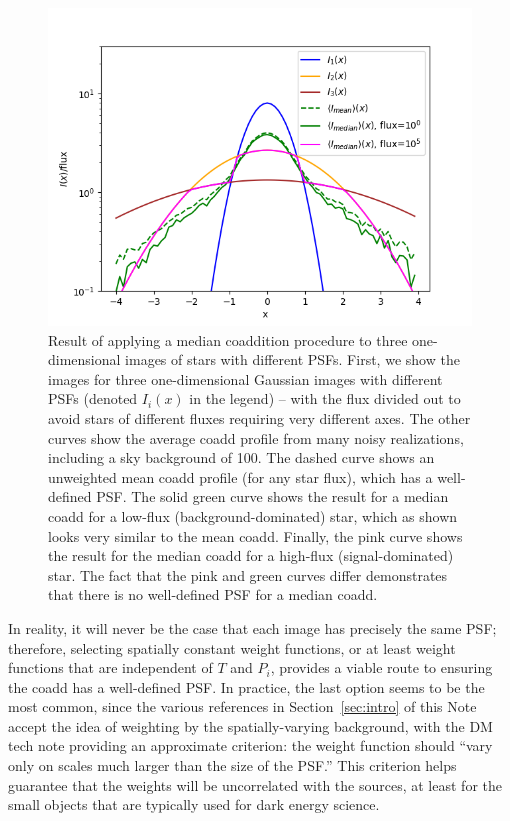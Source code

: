 \documentclass[modern]{style_and_logos/lsstdescnote}
\newcommand{\rachel}[1]{{\color{magenta}RM: #1}}
\begin{document}
\begin{figure}
\begin{center}
\includegraphics[width=5in]{figures/noisy_median_coadd_psf.png}
 \caption{Result of applying a median coaddition procedure to three one-dimensional images of stars with different PSFs. 
 First, we show the images for three one-dimensional Gaussian images with different PSFs (denoted $I_i(x)$ in the legend) -- with the flux divided out to avoid stars of different fluxes requiring very different axes.  The other curves show the average coadd profile from many noisy realizations, including a sky background of 100.  The dashed curve shows an unweighted mean coadd profile (for any star flux), which has a well-defined PSF.  The solid green curve shows the result for a median coadd for a low-flux (background-dominated) star, which as shown looks very similar to the mean coadd.  Finally, the pink curve shows the result for the median coadd for a high-flux (signal-dominated) star.  
 The fact that the pink and green curves differ demonstrates that there is no well-defined PSF for a median coadd.
 }
 \label{fig:median_coadd_psf}
\end{center}
 \end{figure}

In reality, it will never be the case that each image has precisely the same PSF; therefore, selecting spatially constant weight functions, or at least weight functions that are independent of $T$ and $P_i$, provides a viable route to ensuring the coadd has a well-defined PSF.  
In practice, the last option seems to be the most common, since the various references in Section~\ref{sec:intro} of this Note accept the idea of weighting by the spatially-varying background, with the DM tech note providing an approximate criterion: the weight function should ``vary only on scales much larger than the size of the PSF.''  This criterion helps guarantee that the weights will be uncorrelated with the sources, at least for the small objects that are typically used for dark energy science.
\end{document}
